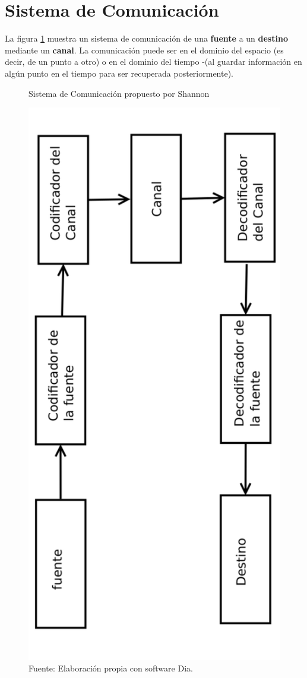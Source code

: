 \section{\quad Sistema de Comunicación}
La figura \ref{fig:sistemaComunicacion} muestra un sistema de comunicación de una \textbf{fuente} a un \textbf{destino} mediante un \textbf{canal}. La comunicación puede ser en el dominio del espacio (es decir, de un punto a otro) o en el dominio del tiempo -(al guardar información en algún punto en el tiempo para ser recuperada posteriormente).
\begin{figure}
\centering
\caption{Sistema de Comunicación propuesto por Shannon}
\includegraphics[angle=-90,width=0.9\linewidth]{Pictures/sistema.pdf}
\caption*{Fuente: Elaboración propia con software Dia.}
\label{fig:sistemaComunicacion}
\end{figure}
